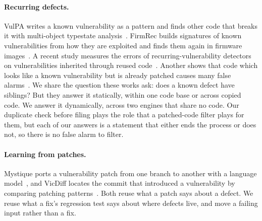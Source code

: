 \paragraph{Recurring defects.} VulPA writes a known vulnerability as a pattern
and finds other code that breaks it with multi-object typestate
analysis~\cite{cao2025vulpa}. FirmRec builds signatures of known
vulnerabilities from how they are exploited and finds them again in firmware
images~\cite{xiao2024firmrec}. A recent study measures the errors of
recurring-vulnerability detectors on vulnerabilities inherited through reused
code~\cite{cao2025antman}. Another shows that code which looks
like a known vulnerability but is already patched causes many false
alarms~\cite{tan2025fvf}. We share the question these works ask: does a known
defect have siblings? But they answer it statically, within one code base or
across copied code. We answer it dynamically, across two engines that share no
code. Our duplicate check before filing plays the role that a patched-code
filter plays for them, but each of our answers is a statement that either ends
the process or does not, so there is no false alarm to filter.

\paragraph{Learning from patches.} Mystique ports a vulnerability patch from one
branch to another with a language model~\cite{wu2025mystique}, and VicDiff
locates the commit that introduced a vulnerability by comparing patching
patterns~\cite{guo2026vicdiff}. Both reuse what a patch says about a defect. We
reuse what a fix's regression test says about where defects live, and move a
failing input rather than a fix.
